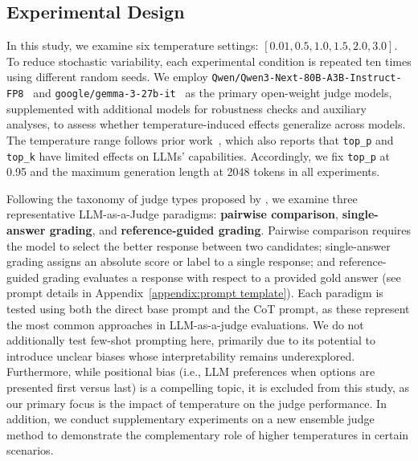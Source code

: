 \documentclass[11pt]{article}
\begin{document}










\subsection{Experimental Design}

In this study, we examine six temperature settings: \([0.01, 0.5, 1.0, 1.5, 2.0, 3.0]\). 
To reduce stochastic variability, each experimental condition is repeated ten times using different random seeds. We employ \texttt{Qwen/Qwen3-Next-80B-A3B-Instruct-FP8}~\cite{qwen2.5-1m, qwen3technicalreport} and \texttt{google/gemma-3-27b-it}~\cite{gemma_2025} as the primary open-weight judge models, supplemented with additional models for robustness checks and auxiliary analyses, to assess whether temperature-induced effects generalize across models. The temperature range follows prior work~\cite{LI2025242}, which also reports that \texttt{top\_p} and \texttt{top\_k} have limited effects on LLMs' capabilities. Accordingly, we fix \texttt{top\_p} at 0.95 and the maximum generation length at 2048 tokens in all experiments.

Following the taxonomy of judge types proposed by \cite{10.5555/3666122.3668142}, we examine three representative LLM-as-a-Judge paradigms: \textbf{pairwise comparison}, \textbf{single-answer grading}, and \textbf{reference-guided grading}. Pairwise comparison requires the model to select the better response between two candidates; single-answer grading assigns an absolute score or label to a single response; and reference-guided grading evaluates a response with respect to a provided gold answer (see prompt details in Appendix~\ref{appendix:prompt template}). Each paradigm is tested using both the direct base prompt and the CoT prompt, as these represent the most common approaches in LLM-as-a-judge evaluations. 
We do not additionally test few-shot prompting here, primarily due to its potential to introduce unclear biases whose interpretability remains underexplored. 
Furthermore, while positional bias (i.e., LLM preferences when options are presented first versus last) is a compelling topic, it is excluded from this study, as our primary focus is the impact of temperature on the judge performance. In addition, we conduct supplementary experiments on a new ensemble judge method to demonstrate the complementary role of higher temperatures in certain scenarios.
\end{document}
